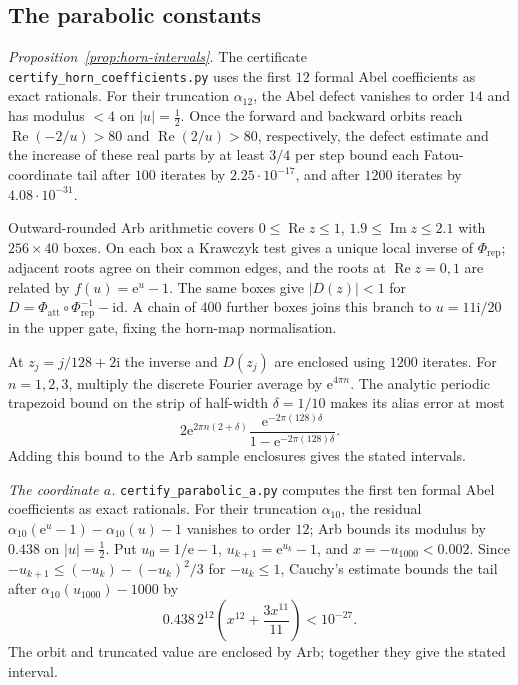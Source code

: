 \documentclass[11pt]{amsart}
\theoremstyle{definition}
\newcommand{\eee}{\mathrm{e}}
\newcommand{\ii}{\mathrm{i}}
\begin{document}
\subsection{The parabolic constants}\label{app:horn}
\emph{Proposition~\ref{prop:horn-intervals}.}  The certificate \texttt{certify\_horn\_coefficients.py} uses the first
$12$ formal Abel coefficients as exact rationals.  For their truncation
$\alpha_{12}$, the Abel defect vanishes to order $14$ and has modulus
$<4$ on $|u|=\tfrac12$.  Once the forward and backward orbits reach
$\operatorname{Re}(-2/u)>80$ and $\operatorname{Re}(2/u)>80$, respectively,
the defect estimate and the increase of these real parts by at least
$3/4$ per step bound each Fatou-coordinate tail after $100$ iterates
by $2.25\cdot10^{-17}$, and after $1200$ iterates by
$4.08\cdot10^{-31}$.

Outward-rounded Arb arithmetic covers
$0\le\operatorname{Re}z\le1$, $1.9\le\operatorname{Im}z\le2.1$ with
$256\times40$ boxes.  On each box a Krawczyk test gives a unique local
inverse of $\Phi_{\mathrm{rep}}$; adjacent roots agree on their common
edges, and the roots at $\operatorname{Re}z=0,1$ are related by
$f(u)=\eee^u-1$.  The same boxes give
$|D(z)|<1$ for
$D=\Phi_{\mathrm{att}}\circ\Phi_{\mathrm{rep}}^{-1}-\mathrm{id}$.
A chain of $400$ further boxes joins this branch to $u=11\ii/20$ in
the upper gate, fixing the horn-map normalisation.

At $z_j=j/128+2\ii$ the inverse and $D(z_j)$ are enclosed using
$1200$ iterates.  For $n=1,2,3$, multiply the discrete Fourier average
by $\eee^{4\pi n}$.  The analytic periodic trapezoid bound on the
strip of half-width $\delta=1/10$ makes its alias error at most
\[
 2\eee^{2\pi n(2+\delta)}
 \frac{\eee^{-2\pi(128)\delta}}
      {1-\eee^{-2\pi(128)\delta}}.
\]
Adding this bound to the Arb sample enclosures gives the stated
intervals.

\emph{The coordinate $a$.}  \texttt{certify\_parabolic\_a.py} computes the first ten formal Abel
coefficients as exact rationals.  For their truncation $\alpha_{10}$, the
residual $\alpha_{10}(\eee^u-1)-\alpha_{10}(u)-1$ vanishes to order $12$;
Arb bounds its modulus by $0.438$ on $|u|=\tfrac12$.  Put
$u_0=1/\eee-1$, $u_{k+1}=\eee^{u_k}-1$, and $x=-u_{1000}<0.002$.
Since $-u_{k+1}\le(-u_k)-(-u_k)^2/3$ for $-u_k\le1$, Cauchy's estimate
bounds the tail after $\alpha_{10}(u_{1000})-1000$ by
\[
 0.438\,2^{12}\left(x^{12}+\frac{3x^{11}}{11}\right)<10^{-27}.
\]
The orbit and truncated value are enclosed by Arb; together they give the
stated interval.
\end{document}
